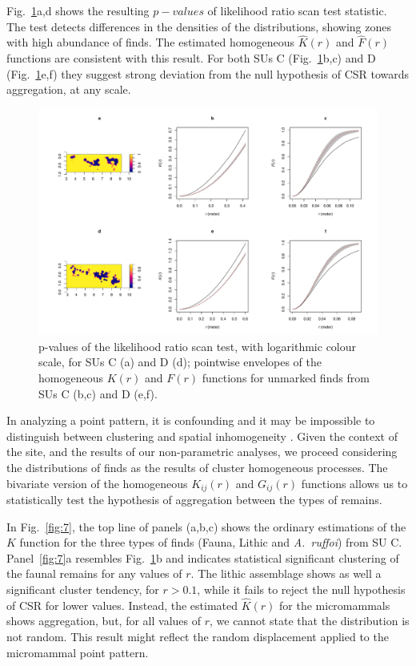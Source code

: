 \documentclass[review,authoryear]{elsarticle} %
\begin{document}
Fig.~\ref{fig:6}a,d shows the resulting $p-values$ of likelihood ratio scan test statistic. The test detects differences in the densities of the distributions, showing zones with high abundance of finds. The estimated homogeneous $\hat K(r)$ and $\hat F(r)$ functions are consistent with this result. For both SUs C (Fig.~\ref{fig:6}b,c) and D (Fig.~\ref{fig:6}e,f) they suggest strong deviation from the null hypothesis of CSR towards aggregation, at any scale.

\begin{figure}
  \centering
  \includegraphics[width=1\textwidth]{../artwork/Fig6.pdf}
  \caption{p-values of the likelihood ratio scan test, with logarithmic colour scale, for SUs C (a) and D (d); pointwise envelopes of the homogeneous $K(r)$ and $F(r)$ functions for unmarked finds from SUs C (b,c) and D (e,f).}
  \label{fig:6}
\end{figure}

In analyzing a point pattern, it is confounding and it may be impossible to distinguish between clustering and spatial inhomogeneity \citep{Baddeley2015}. Given the context of the site, and the results of our non-parametric analyses, we proceed considering the distributions of finds as the results of cluster homogeneous processes. The bivariate version of the homogeneous $K_{ij}(r)$ and $G_{ij}(r)$ functions allows us to statistically test the hypothesis of aggregation between the types of remains.

In Fig.~\ref{fig:7}, the top line of panels (a,b,c) shows the ordinary estimations of the $K$ function for the three types of finds (Fauna, Lithic and \emph{A.~ruffoi}) from SU C. Panel~\ref{fig:7}a resembles Fig.~\ref{fig:6}b and indicates statistical significant clustering of the faunal remains for any values of $r$. The lithic assemblage shows as well a significant cluster tendency, for $r>0.1$, while it fails to reject the null hypothesis of CSR for lower values. Instead, the estimated $\hat{K}(r)$ for the micromammals shows aggregation, but, for all values of $r$, we cannot state that the distribution is not random. This result might reflect the random displacement applied to the micromammal point pattern.
\end{document}
